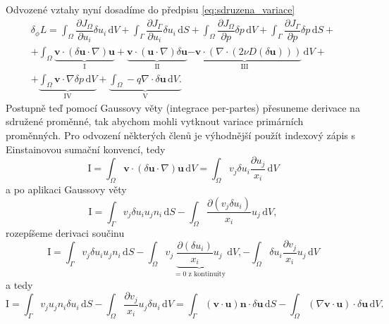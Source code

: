 Odvozené vztahy nyní dosadíme do předpisu \ref{eq:sdruzena_variace}
\begin{multline}
\delta_\phi L = 
\int_{\Omega} \dfrac{\partial J_{\Omega}}{\partial u_i} \delta u_i \, \mathrm{d}V 
+ 
\int_{\Gamma} \dfrac{\partial J_{\Gamma}}{\partial u_i} \delta u_i \, \mathrm{d}S
+
\int_{\Omega} \dfrac{\partial J_{\Omega}}{\partial p} \delta p  \, \mathrm{d}V 
+ 
\int_{\Gamma} \dfrac{\partial J_{\Gamma}}{\partial p} \delta p  \, \mathrm{d}S
+\\+
\int_{\Omega} 
		\underbrace{\mathbf{v} \cdot(\delta \mathbf{u}\cdot \nabla )\mathbf{u}}_\mathrm{I}
		+ \underbrace{\mathbf{v} \cdot(\mathbf{u}\cdot \nabla )\delta\mathbf{u}}_\mathrm{II}
		\underbrace{ - \mathbf{v} \cdot (\nabla \cdot (2\nu D(\delta \mathbf{u}) ))}_\mathrm{III}
\, \mathrm{d}V
+\\+
\underbrace{
\int_{\Omega} 
 \mathbf{v} \cdot \nabla \delta p
\, \mathrm{d}V
}_\mathrm{IV}
+
\underbrace{
\int_{\Omega} 
  - q \nabla \cdot \delta \mathbf{u}
\, \mathrm{d}V.
}_\mathrm{V} 
\end{multline}
Postupně teď pomocí Gaussovy věty (integrace per-partes) přesuneme derivace na sdružené proměnné, tak abychom mohli vytknout variace primárních proměnných. Pro odvození některých členů je výhodnější použít indexový zápis s Einstainovou sumační konvencí, tedy
\begin{equation*}
\mathrm{I}
=
\int_{\Omega} 
\mathbf{v}\cdot(\delta\mathbf{u}\cdot \nabla)\mathbf{u}
\, \mathrm{d}V
=
\int_{\Omega} 
v_j \delta u_i \frac{\partial u_j}{x_i}
\, \mathrm{d}V
\end{equation*}
a po aplikaci Gaussovy věty
\begin{equation*}
\mathrm{I}
=
\int_{\Gamma} 
v_j \delta u_i u_j n_i
\, \mathrm{d}S
-
\int_{\Omega} 
\frac{\partial( v_j \delta u_i )}{x_i}u_j
\, \mathrm{d}V,
\end{equation*}
rozepíšeme derivaci součinu
\begin{equation*}
\mathrm{I}
=
\int_{\Gamma} 
v_j \delta u_i u_j n_i
\, \mathrm{d}S
-
\int_{\Omega} 
v_j\underbrace{\frac{\partial( \delta u_i )}{x_i}u_j}_{=0 \text{ z kontinuity} }
\, \mathrm{d}V,
-
\int_{\Omega} 
\delta u_i \frac{\partial v_j  }{x_i}u_j
\, \mathrm{d}V
\end{equation*} 
a tedy
\begin{equation}\label{eq:clen_I}
\mathrm{I}
=
\int_{\Gamma} 
v_j u_j n_i \delta u_i 
\, \mathrm{d}S
-
\int_{\Omega} 
\frac{\partial v_j  }{x_i} u_j \delta u_i
\, \mathrm{d}V
=
\int_{\Gamma} 
(\mathbf{v}\cdot \mathbf{u} )\mathbf{n} \cdot \delta\mathbf{u}
\, \mathrm{d}S
-
\int_{\Omega} 
(\nabla \mathbf{v}\cdot \mathbf{u})\cdot\delta \mathbf{u}
\, \mathrm{d}V.
\end{equation}
